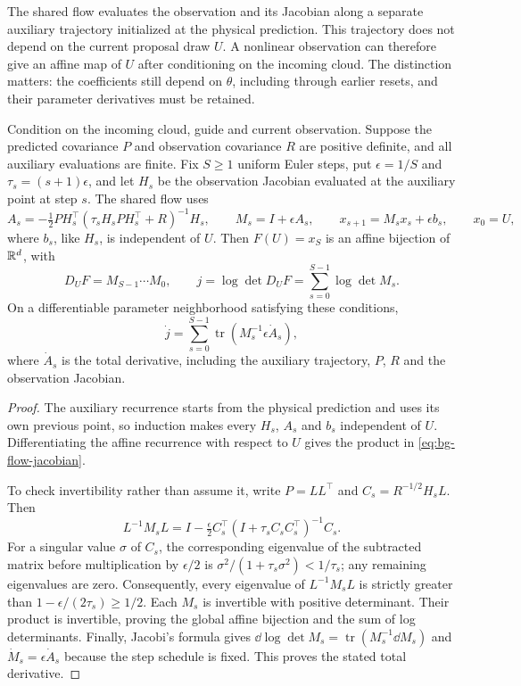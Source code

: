 The shared flow evaluates the observation and its Jacobian along a separate
auxiliary trajectory initialized at the physical prediction. This trajectory
does not depend on the current proposal draw $U$. A nonlinear observation can
therefore give an affine map of $U$ after conditioning on the incoming cloud.
The distinction matters: the coefficients still depend on $\theta$, including
through earlier resets, and their parameter derivatives must be retained.

\begin{proposition}
\label{prop:bg-flow-jacobian}
Condition on the incoming cloud, guide and current observation. Suppose the
predicted covariance $P$ and observation covariance $R$ are positive definite,
and all auxiliary evaluations are finite. Fix $S\geq1$ uniform Euler steps,
put $\epsilon=1/S$ and $\tau_s=(s+1)\epsilon$, and let $H_s$ be the observation
Jacobian evaluated at the auxiliary point at step $s$. The shared flow uses
\[
 A_s=-\tfrac12 PH_s^\top(\tau_sH_sPH_s^\top+R)^{-1}H_s,
 \qquad M_s=I+\epsilon A_s,
 \qquad x_{s+1}=M_sx_s+\epsilon b_s,
 \qquad x_0=U,
\]
where $b_s$, like $H_s$, is independent of $U$. Then $F(U)=x_S$ is an affine
bijection of $\mathbb{R}^d$, with
\begin{equation}
 D_UF=M_{S-1}\cdots M_0,
 \qquad j=\log\det D_UF=\sum_{s=0}^{S-1}\log\det M_s.
 \label{eq:bg-flow-jacobian}
\end{equation}
On a differentiable parameter neighborhood satisfying these conditions,
\[
 \dot j=\sum_{s=0}^{S-1}
       \operatorname{tr}\!\left(M_s^{-1}\epsilon\dot A_s\right),
\]
where $\dot A_s$ is the total derivative, including the auxiliary trajectory,
$P$, $R$ and the observation Jacobian.
\end{proposition}
\begin{proof}
The auxiliary recurrence starts from the physical prediction and uses its own
previous point, so induction makes every $H_s$, $A_s$ and $b_s$ independent of
$U$. Differentiating the affine recurrence with respect to $U$ gives the
product in \eqref{eq:bg-flow-jacobian}.

To check invertibility rather than assume it, write $P=LL^\top$ and
$C_s=R^{-1/2}H_sL$. Then
\[
 L^{-1}M_sL
 =I-\tfrac{\epsilon}{2}
 C_s^\top(I+\tau_sC_sC_s^\top)^{-1}C_s.
\]
For a singular value $\sigma$ of $C_s$, the corresponding eigenvalue of the
subtracted matrix before multiplication by $\epsilon/2$ is
$\sigma^2/(1+\tau_s\sigma^2)<1/\tau_s$; any remaining eigenvalues are zero.
Consequently, every eigenvalue of $L^{-1}M_sL$ is strictly greater than
$1-\epsilon/(2\tau_s)\geq1/2$. Each $M_s$ is invertible with positive
determinant. Their product is invertible, proving the global affine
bijection and the sum of log determinants. Finally, Jacobi's formula gives
$\dd\log\det M_s=\operatorname{tr}(M_s^{-1}\dd M_s)$ and
$\dot M_s=\epsilon\dot A_s$ because the step schedule is fixed. This proves
the stated total derivative.
\end{proof}

